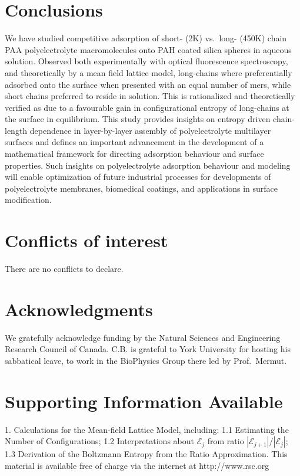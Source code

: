 \documentclass[twoside,twocolumn,9pt]{article}
\begin{document}
\section{Conclusions}    %
   \label{sec-conc}

We have studied competitive adsorption of short- (2K) vs.\ long- (450K) chain PAA polyelectrolyte macromolecules onto PAH coated silica spheres in aqueous solution. Observed both experimentally with optical fluorescence spectroscopy, and theoretically by a mean field lattice model, long-chains where preferentially adsorbed onto the surface when presented with an equal number of mers, while short chains preferred to reside in solution. This is rationalized and theoretically verified as due to a favourable gain in configurational entropy of long-chains at the surface in equilibrium. This study provides insights on entropy driven chain-length dependence in layer-by-layer assembly of polyelectrolyte multilayer surfaces and defines an important advancement in the development of a mathematical framework for directing adsorption behaviour and surface properties. Such insights on polyelectrolyte adsorption behaviour and modeling will enable optimization of future industrial processes for developments of polyelectrolyte membranes, biomedical coatings, and applications in surface modification.


\section*{Conflicts of interest}
There are no conflicts to declare.

\section*{Acknowledgments}
We gratefully acknowledge funding by the Natural 
Sciences and Engineering Research Council of Canada.
C.B. is grateful to York University for hosting his sabbatical leave, to work in the BioPhysics Group there led by Prof.\ Mermut.

\section*{Supporting Information Available}
1.  Calculations for the Mean-field Lattice Model, 
including: 1.1 Estimating the Number of Configurations;
1.2 Interpretations about $\mathcal{E}_j$ from 
ratio $|\mathcal{E}_{j+1}|/|\mathcal{E}_j|$;
1.3 Derivation of the Boltzmann Entropy from the 
Ratio Approximation.  This material is available free of
charge via the internet at  http://www.rsc.org




\balance




\end{document}
